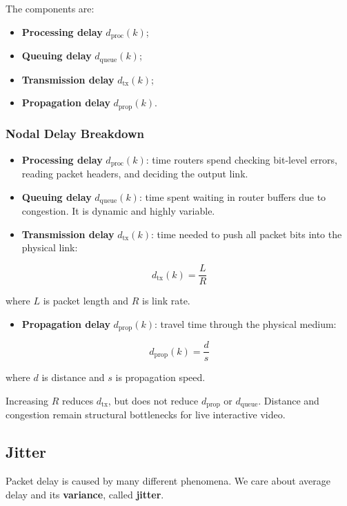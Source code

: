 The components are:

\begin{itemize}
\item \textbf{Processing delay} $d_{\text{proc}}(k)$;
\item \textbf{Queuing delay} $d_{\text{queue}}(k)$;
\item \textbf{Transmission delay} $d_{\text{tx}}(k)$;
\item \textbf{Propagation delay} $d_{\text{prop}}(k)$.
\end{itemize}

\subsubsection{Nodal Delay Breakdown}

\begin{itemize}
\item \textbf{Processing delay} $d_{\text{proc}}(k)$: time routers spend checking bit-level errors, reading packet headers, and deciding the output link.
\item \textbf{Queuing delay} $d_{\text{queue}}(k)$: time spent waiting in router buffers due to congestion. It is dynamic and highly variable.
\item \textbf{Transmission delay} $d_{\text{tx}}(k)$: time needed to push all packet bits into the physical link:
\end{itemize}

\[
d_{\text{tx}}(k) = \frac{L}{R}
\]

where $L$ is packet length and $R$ is link rate.

\begin{itemize}
\item \textbf{Propagation delay} $d_{\text{prop}}(k)$: travel time through the physical medium:
\end{itemize}

\[
d_{\text{prop}}(k) = \frac{d}{s}
\]

where $d$ is distance and $s$ is propagation speed.

Increasing $R$ reduces $d_{\text{tx}}$, but does not reduce $d_{\text{prop}}$ or $d_{\text{queue}}$. Distance and congestion remain structural bottlenecks for live interactive video.

\subsection{Jitter}

Packet delay is caused by many different phenomena. We care about average delay and its \textbf{variance}, called \textbf{jitter}.

